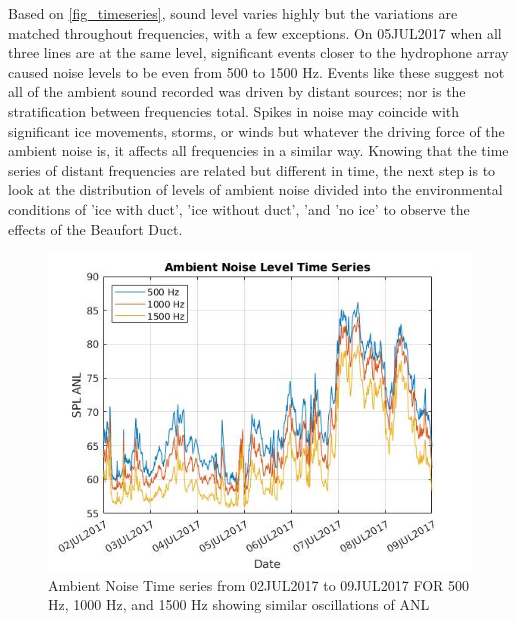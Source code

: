 Based on \autoref{fig_timeseries}, sound level varies highly but the variations are matched throughout frequencies, with a few exceptions. On 05JUL2017 when all three lines are at the same level, significant events closer to the hydrophone array caused noise levels to be even from 500 to 1500 Hz. Events like these suggest not all of the ambient sound recorded was driven by distant sources; nor is the stratification between frequencies total. Spikes in noise may coincide with significant ice movements, storms, or winds but whatever the driving force of the ambient noise is, it affects all frequencies in a similar way. Knowing that the time series of distant frequencies are related but different in time, the next step is to look at the distribution of levels of ambient noise divided into the environmental conditions of 'ice with duct', 'ice without duct', 'and 'no ice' to observe the effects of the Beaufort Duct.


\begin{figure}[ht]
\centering
\includegraphics[scale=0.6]{Figures/timeseries_500_1500_july_overlay.jpg}
\caption{Ambient Noise Time series from 02JUL2017 to 09JUL2017 FOR 500 Hz, 1000 Hz, and 1500 Hz showing similar oscillations of ANL}
\label{fig_timeseries}
\end{figure}





